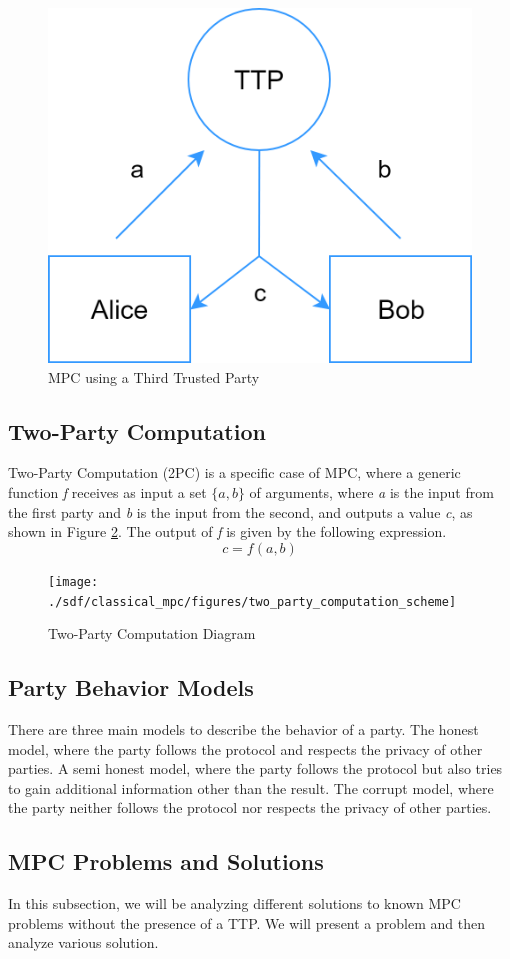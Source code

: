 \begin{refsection}
\renewcommand{\figurename}{Figure}
\begin{figure}[H]
\centering
\includegraphics[width=.3\linewidth]{./sdf/classical_mpc/figures/ttp_scheme}
\caption{MPC using a Third Trusted Party}
\label{fig:ttpscheme}
\end{figure}

\subsection{Two-Party Computation}
Two-Party Computation (2PC) is a specific case of MPC, where a generic function \textit{f} receives as input a set $\{a,b\}$
of arguments, where \textit{a} is the input from the first party and \textit{b} is the input from the second,
and outputs a value \textit{c}, as shown in Figure \ref{fig:tpcscheme}.
The output of \textit{f} is given by the following expression.
\begin{equation}\label{eq:tpc}
c = f(a,b)
\end{equation}

\renewcommand{\figurename}{Figure}
\begin{figure}[H]
\centering
\texttt{[image: ./sdf/classical\_mpc/figures/two\_party\_computation\_scheme]}
\caption{Two-Party Computation Diagram}
\label{fig:tpcscheme}
\end{figure}

\subsection{Party Behavior Models}
There are three main models to describe the behavior of a party. The honest model, where the party follows the protocol and respects the privacy of other parties. A semi honest model, where the party follows the protocol but also tries to gain additional information other than the result. The corrupt model, where the party neither follows the protocol nor respects the privacy of other parties.

\pagebreak

\subsection{MPC Problems and Solutions}\label{mpcproblemsandsolutions}
In this subsection, we will be analyzing different solutions to known MPC problems without the presence of a TTP. We will present a problem and then analyze various solution.


\end{refsection}
